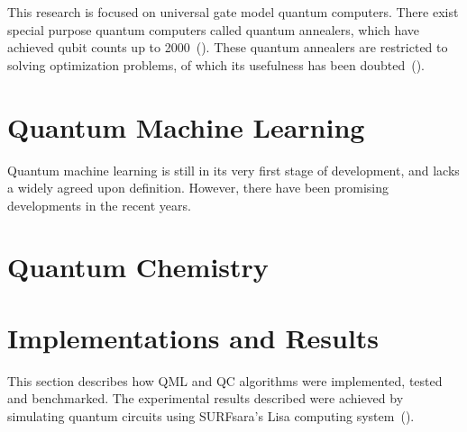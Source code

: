 \documentclass[a4paper,10pt]{article}
\begin{document}
This research is focused on universal gate model quantum computers.
There exist special purpose quantum computers called quantum annealers, which have achieved qubit counts up to 2000~(\cite{dwave-2000}).
These quantum annealers are restricted to solving optimization problems, of which its usefulness has been doubted~(\cite{how-quantum-dwave, aaronson-dwave, detecting-quantum-speedup}).

\section{Quantum Machine Learning} \label{sec:quantum-ml}
Quantum machine learning is still in its very first stage of development, and lacks a widely agreed upon definition.
However, there have been promising developments in the recent years.

\section{Quantum Chemistry} \label{sec:quantum-chemistry}

\section{Implementations and Results} \label{sec:implementation-and-results}
This section describes how QML and QC algorithms were implemented, tested and benchmarked.
The experimental results described were achieved by simulating quantum circuits using SURFsara's Lisa computing system~(\cite{surfsara-lisa}).
\end{document}
